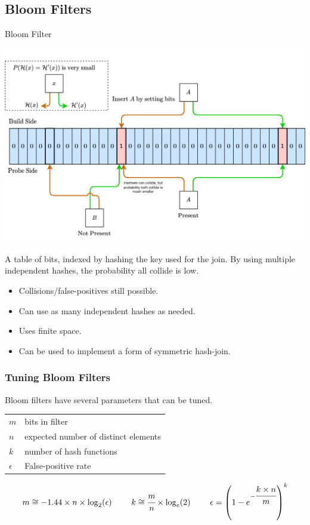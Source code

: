 \subsection{Bloom Filters}
\begin{definitionbox}{Bloom Filter}
    \begin{center}
        \includegraphics[width=\textwidth]{streams/images/bloom_filter.drawio.png}
    \end{center}
    A table of bits, indexed by hashing the key used for the join. By using multiple independent hashes, the probability all collide is low.
    \begin{itemize}
        \item Collisions/false-positives still possible.
        \item Can use as many independent hashes as needed.
        \item Uses finite space.
        \item Can be used to implement a form of symmetric hash-join.
    \end{itemize}
\end{definitionbox}
\subsubsection{Tuning Bloom Filters}
\noindent Bloom filters have several parameters that can be tuned.
\\ \begin{tabular}{l p{}}
    $m$        & bits in filter                       \\
    $n$        & expected number of distinct elements \\
    $k$        & number of hash functions             \\
    $\epsilon$ & False-positive rate                  \\
\end{tabular}
\[\begin{matrix}
        m \cong -1.44 \times n \times \log_2(\epsilon) & \  &
        k \cong \cfrac{m}{n} \times \log_e(2)          & \  &
        \epsilon  = \left( 1 - e^{-\cfrac{k \times n}{m}}\right)^k \\
    \end{matrix}\]
